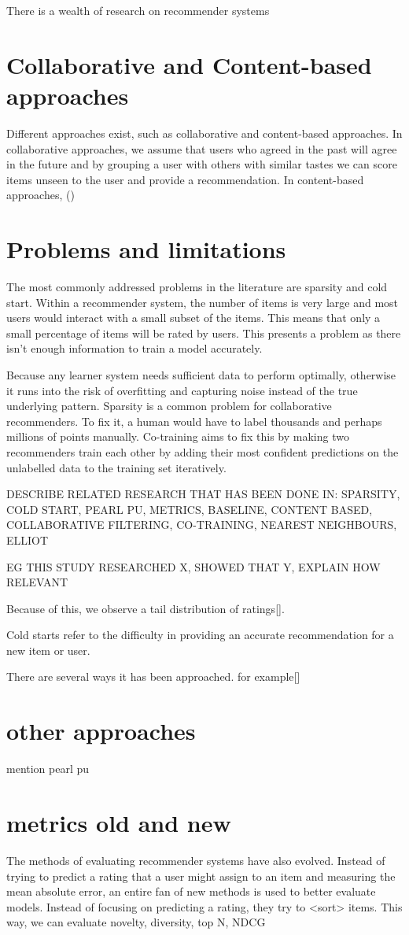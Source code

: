 There is a wealth of research on recommender systems

\section{Collaborative and Content-based approaches}
Different approaches exist, such as collaborative and content-based approaches. In collaborative approaches, we assume that users who agreed in the past will agree in the future and by grouping a user with others with similar tastes we can score items unseen to the user and provide a recommendation. In content-based approaches, ()

\section{Problems and limitations}
The most commonly addressed problems in the literature are sparsity and cold start. Within a recommender system, the number of items is very large and most users would interact with a small subset of the items. This means that only a small percentage of items will be rated by users. This presents a problem as there isn’t enough information to train a model accurately.  

Because any learner system needs sufficient data to perform optimally, otherwise it runs into the risk of overfitting and capturing noise instead of the true underlying pattern. Sparsity is a common problem for collaborative recommenders. To fix it, a human would have to label thousands and perhaps millions of points manually. Co-training aims to fix this by making two recommenders train each other by adding their most confident predictions on the unlabelled data to the training set iteratively.

DESCRIBE RELATED RESEARCH THAT HAS BEEN DONE IN: SPARSITY, COLD START, PEARL PU, METRICS, BASELINE, CONTENT BASED, COLLABORATIVE FILTERING, CO-TRAINING, NEAREST NEIGHBOURS, ELLIOT

EG THIS STUDY RESEARCHED X, SHOWED THAT Y, EXPLAIN HOW RELEVANT

Because of this, we observe a tail distribution of ratings[].


Cold starts refer to the difficulty in providing an accurate recommendation for a new item or user. 

 There are several ways it has been approached.  for example[] 


\section{other approaches}
mention pearl pu

\section{metrics old and new}
The methods of evaluating recommender systems have also evolved. Instead of trying to predict a rating that a user might assign to an item and measuring the mean absolute error, an entire fan of new methods is used to better evaluate models.
Instead of focusing on predicting a rating, they try to <sort> items. This way, we can evaluate novelty, diversity, top N, NDCG 
